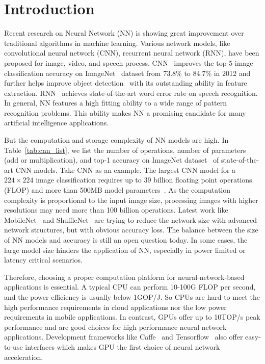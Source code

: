 \section{Introduction}\label{sec:introduction}

Recent research on Neural Network (NN) is showing great improvement over traditional algorithms in machine learning. Various network models, like convolutional neural network (CNN), recurrent neural network (RNN), have been proposed for image, video, and speech process. CNN~\cite{krizhevsky2012imagenet} improves the top-5 image classification accuracy on ImageNet~\cite{ILSVRC15} dataset from 73.8\% to 84.7\% in 2012 and further helps improve object detection~\cite{girshick2014rich} with its outstanding ability in feature extraction. RNN~\cite{hannun2014deep} achieves state-of-the-art word error rate on speech recognition. In general, NN features a high fitting ability to a wide range of pattern recognition problems. This ability makes NN a promising candidate for many artificial intelligence applications.

But the computation and storage complexity of NN models are high. In Table~\ref{tab:cnn_list}, we list the number of operations, number of parameters (add or multiplication), and top-1 accuracy on ImageNet dataset~\cite{ILSVRC15} of state-of-the-art CNN models. Take CNN as an example. The largest CNN model for a $224\times224$ image classification requires up to 39 billion floating point operations (FLOP) and more than 500MB model parameters~\cite{simonyan2014very}. As the computation complexity is proportional to the input image size, processing images with higher resolutions may need more than 100 billion operations. Latest work like MobileNet~\cite{Howard2017MobileNets} and ShuffleNet~\cite{zhang2017shufflenet} are trying to reduce the network size with advanced network structures, but with obvious accuracy loss. The balance between the size of NN models and accuracy is still an open question today. In some cases, the large model size hinders the application of NN, especially in power limited or latency critical scenarios.



Therefore, choosing a proper computation platform for neural-network-based applications is essential. A typical CPU can perform 10-100G FLOP per second, and the power efficiency is usually below 1GOP/J. So CPUs are hard to meet the high performance requirements in cloud applications nor the low power requirements in mobile applications. In contrast, GPUs offer up to 10TOP/s peak performance and are good choices for high performance neural network applications. Development frameworks like Caffe~\cite{jia2014caffe} and Tensorflow~\cite{abadi2016tensorflow} also offer easy-to-use interfaces which makes GPU the first choice of neural network acceleration. 


